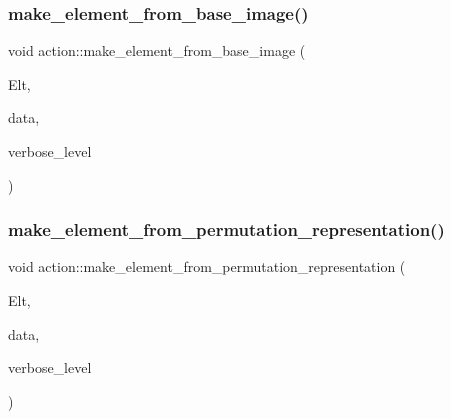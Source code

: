 \subsubsection{\texorpdfstring{make\+\_\+element\+\_\+from\+\_\+base\+\_\+image()}{make\_element\_from\_base\_image()}}
{\footnotesize\ttfamily void action\+::make\+\_\+element\+\_\+from\+\_\+base\+\_\+image (\begin{DoxyParamCaption}\item[{\mbox{\hyperlink{galois_8h_a09fddde158a3a20bd2dcadb609de11dc}{I\+NT}} $\ast$}]{Elt,  }\item[{\mbox{\hyperlink{galois_8h_a09fddde158a3a20bd2dcadb609de11dc}{I\+NT}} $\ast$}]{data,  }\item[{\mbox{\hyperlink{galois_8h_a09fddde158a3a20bd2dcadb609de11dc}{I\+NT}}}]{verbose\+\_\+level }\end{DoxyParamCaption})}

\mbox{\label{classaction_a949f7580f3b1263d7a73fe388c97afd2}} 
\subsubsection{\texorpdfstring{make\+\_\+element\+\_\+from\+\_\+permutation\+\_\+representation()}{make\_element\_from\_permutation\_representation()}}
{\footnotesize\ttfamily void action\+::make\+\_\+element\+\_\+from\+\_\+permutation\+\_\+representation (\begin{DoxyParamCaption}\item[{\mbox{\hyperlink{galois_8h_a09fddde158a3a20bd2dcadb609de11dc}{I\+NT}} $\ast$}]{Elt,  }\item[{\mbox{\hyperlink{galois_8h_a09fddde158a3a20bd2dcadb609de11dc}{I\+NT}} $\ast$}]{data,  }\item[{\mbox{\hyperlink{galois_8h_a09fddde158a3a20bd2dcadb609de11dc}{I\+NT}}}]{verbose\+\_\+level }\end{DoxyParamCaption})}

\mbox{\label{classaction_a926b90c3aafacbf77ffd99d50a8408cb}} 
